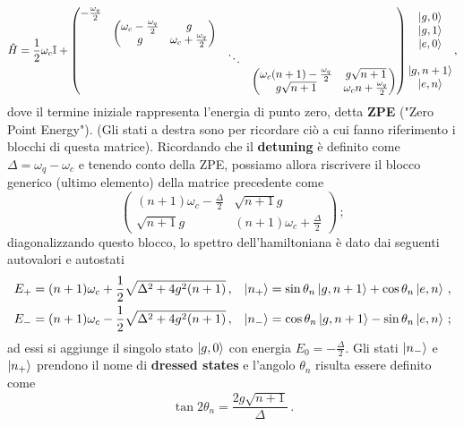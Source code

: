 \begin{equation*}
    \hat H = \frac 12 \omega_c \mathbb{I} + 
    \begin{pmatrix}
        -\frac{\omega_q}2 & & & \\
        & \begin{pmatrix}
            \omega_c - \frac{\omega_q}2 & g \\
            g & \omega_c + \frac{\omega_q}2
          \end{pmatrix} & & \\
        & & \ddots & \\
        & & & \begin{pmatrix}
            \omega_c(n+1) - \frac{\omega_q}2 & g\sqrt{n+1} \\
            g\sqrt{n+1} & \omega_c n + \frac{\omega_q}2
        \end{pmatrix} \\
    \end{pmatrix}
    \begin{matrix}
        \ket{g,0}\\
        \ket{g,1}\\
        \ket{e,0}\\
        \\
        \ket{g,n+1}\\
        \ket{e,n}
    \end{matrix}\, ,
\end{equation*}
dove il termine iniziale rappresenta l'energia di punto zero, detta \textbf{ZPE} ("Zero Point Energy"). (Gli stati a destra sono per ricordare ciò a cui fanno riferimento i blocchi di questa matrice). Ricordando che il \textbf{detuning} è definito come $\Delta=\omega_q - \omega_c$ e tenendo conto della ZPE, possiamo allora riscrivere il blocco generico (ultimo elemento) della matrice precedente come
\begin{equation*}
    \begin{pmatrix}
        (n+1)\omega_c - \frac{\Delta}2 & \sqrt{n+1}g \\
        \sqrt{n+1}g & (n+1)\omega_c + \frac{\Delta}2
    \end{pmatrix} \, ;
\end{equation*}
diagonalizzando questo blocco, lo spettro dell'hamiltoniana è dato dai seguenti autovalori e autostati
\begin{align*}
    E_+ &= (n+1)\omega_c + \frac 12 \sqrt{\Delta^2+4g^2(n+1)} \, , &\ket{n_+} &= \sin\theta_n \ket{g,n+1} + \cos\theta_n\ket{e,n} \, , \\
    E_- &= (n+1)\omega_c - \frac 12 \sqrt{\Delta^2+4g^2(n+1)} \, , &\ket{n_-} &= \cos\theta_n\ket{g,n+1}-\sin\theta_n\ket{e,n} \, ;
\end{align*} 
ad essi si aggiunge il singolo stato $\ket{g,0}$ con energia $E_0 = - \frac{\Delta}{2}$. Gli stati $\ket{n_-}$ e $\ket{n_+}$ prendono il nome di \textbf{dressed states} e l'angolo $\theta_n$ risulta essere definito come
\begin{equation*}
    \tan {2 \theta_n} = \frac{2g\sqrt{n+1}}{\Delta} \, .
\end{equation*}

